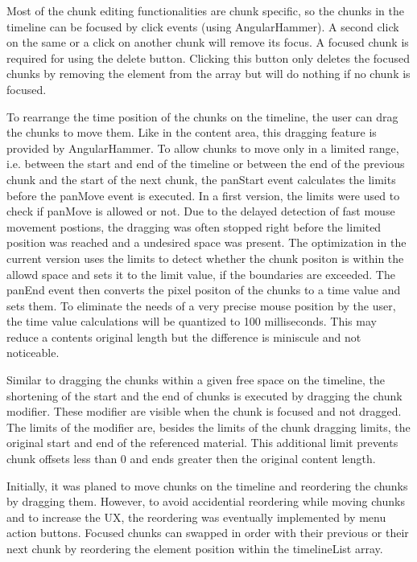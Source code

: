 \documentclass[conference]{IEEEtran}
\begin{document}
Most of the chunk editing functionalities are chunk specific, so the chunks in the timeline can be focused by click events (using AngularHammer).
A second click on the same or a click on another chunk will remove its focus.
A focused chunk is required for using the delete button.
Clicking this button only deletes the focused chunks by removing the element from the array but will do nothing if no chunk is focused.

To rearrange the time position of the chunks on the timeline, the user can drag the chunks to move them.
Like in the content area, this dragging feature is provided by AngularHammer.
To allow chunks to move only in a limited range, i.e. between the start and end of the timeline or between the end of the previous chunk and the start of the next chunk, the panStart event calculates the limits before the panMove event is executed.
In a first version, the limits were used to check if panMove is allowed or not.
Due to the delayed detection of fast mouse movement postions, the dragging was often stopped right before the limited position was reached and a undesired space was present.
The optimization in the current version uses the limits to detect whether the chunk positon is within the allowd space and sets it to the limit value, if the boundaries are exceeded.
The panEnd event then converts the pixel positon of the chunks to a time value and sets them.
To eliminate the needs of a very precise mouse position by the user, the time value calculations will be quantized to 100 milliseconds.
This may reduce a contents original length but the difference is miniscule and not noticeable.

Similar to dragging the chunks within a given free space on the timeline, the shortening of the start and the end of chunks is executed by dragging the chunk modifier.
These modifier are visible when the chunk is focused and not dragged.
The limits of the modifier are, besides the limits of the chunk dragging limits, the original start and end of the referenced material.
This additional limit prevents chunk offsets less than 0 and ends greater then the original content length. 

Initially, it was planed to move chunks on the timeline and reordering the chunks by dragging them.
However, to avoid accidential reordering while moving chunks and to increase the UX, the reordering was eventually implemented by menu action buttons.
Focused chunks can swapped in order with their previous or their next chunk by reordering the element position within the timelineList array.
\end{document}
